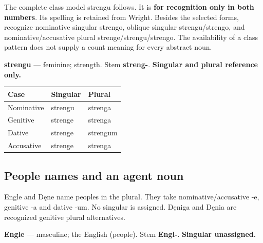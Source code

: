 The complete class model strengu follows. It is \textbf{for recognition only in both numbers}. Its spelling is retained from Wright. Besides the selected forms, recognize nominative singular strengo, oblique singular strengu/\allowbreak{}strengo, and nominative/\allowbreak{}accusative plural strenge/\allowbreak{}strengu/\allowbreak{}strengo. The availability of a class pattern does not supply a count meaning for every abstract noun.

\textbf{strengu} — feminine; strength. Stem \textbf{streng-}. \textbf{Singular and plural reference only.}

\par\begingroup
\fontsize{10.5}{13.2}\selectfont
\setlength{\LTleft}{0pt}\setlength{\LTright}{\fill}
\noindent
\begin{tabular}{@{}>{\raggedright\arraybackslash}p{39.46mm}>{\raggedright\arraybackslash}p{39.46mm}>{\raggedright\arraybackslash}p{39.46mm}@{}}
\toprule
\textbf{Case} & \textbf{Singular} & \textbf{Plural} \\
\midrule
Nominative & strengu & strenga \\
Genitive & strenge & strenga \\
Dative & strenge & strengum \\
Accusative & strenge & strenga \\
\bottomrule
\end{tabular}
\par\endgroup

\subsection*{People names and an agent noun}

Engle and Dęne name peoples in the plural. They take nominative/\allowbreak{}accusative -e, genitive -a and dative -um. No singular is assigned. Dęniga and Dęnia are recognized genitive plural alternatives.

\textbf{Engle} — masculine; the English (people). Stem \textbf{Engl-}. \textbf{Singular unassigned.}


